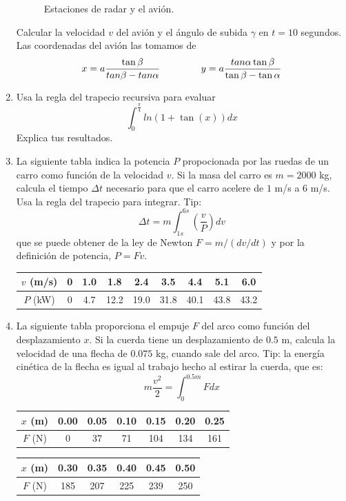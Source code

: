 \documentclass[11pt]{article}
\begin{document}
\begin{enumerate}
\begin{figure}[H]
	\caption{Estaciones de radar y el avi\'{o}n.}
\end{figure}
Calcular la velocidad $v$ del avi\'{o}n y el \'{a}ngulo de subida $\gamma$ en $t=10$ segundos. Las coordenadas del avi\'{o}n las tomamos de
\[x = a \dfrac{\tan \beta}{tan \beta - tan \alpha} \hspace{1.5cm} y= a\dfrac{tan \alpha \tan \beta}{\tan \beta - \tan \alpha}\]
\item Usa la regla del trapecio recursiva para evaluar
\[ \int_{0}^{\frac{\pi}{4}} ln(1 + \tan(x)) dx\]
Explica tus resultados.
\item La siguiente tabla indica la potencia $P$ propocionada por las ruedas de un carro como función de la velocidad $v$. Si la masa del carro es $m=2000$ kg, calcula el tiempo $\Delta t$ necesario para que el carro acelere de $1$ m/s a $6$ m/s. Usa la regla del trapecio para integrar. Tip:
\[ \Delta t = m \int_{1s}^{6s} \left( \dfrac{v}{P} \right) dv\]
que se puede obtener de la ley de Newton $F= m/(dv/dt)$ y por la definición de potencia, $P=Fv$.
\begin{center}
\begin{tabular}{c | c | c | c | c | c | c | c | c}
$v$ (m/s) & 0 & 1.0 & 1.8 & 2.4 & 3.5 & 4.4 & 5.1 & 6.0 \\ \hline
$P$ (kW)  & 0 & 4.7 & 12.2 & 19.0 & 31.8 & 40.1 & 43.8 & 43.2 
\end{tabular}
\end{center}
\item La siguiente tabla proporciona el empuje $F$ del arco como función del desplazamiento $x$. Si la cuerda tiene un desplazamiento de $0.5$ m, calcula la velocidad de una flecha de $0.075$ kg, cuando sale del arco. Tip: la energía cinética de la flecha es igual al trabajo hecho al estirar la cuerda, que es:
\[ m \dfrac{v^{2}}{2} = \int_{0}^{0.5m} F dx\]
\begin{center}
\begin{tabular}{c | c | c | c | c | c | c |}
$x$ (m) & 0.00 & 0.05 & 0.10 & 0.15 & 0.20 & 0.25  \\ \hline
$F$ (N)  & 0 & 37 & 71 & 104 & 134 & 161
\end{tabular}
\end{center}
\begin{center}
\begin{tabular}{c | c | c | c | c | c | }
$x$ (m) & 0.30 & 0.35 & 0.40 & 0.45 & 0.50 \\ \hline
$F$ (N)  & 185 & 207 & 225 & 239 & 250 
\end{tabular}

\end{center}
\end{enumerate}
\end{document}

